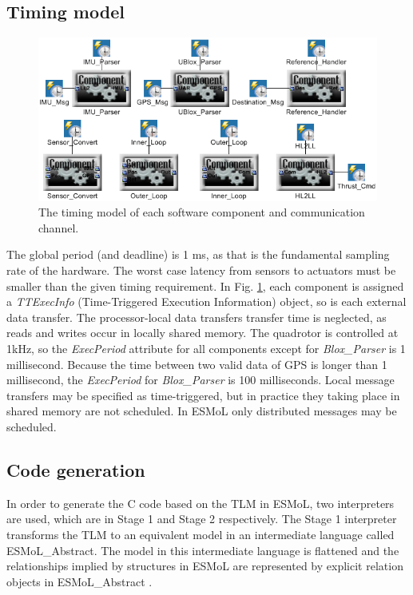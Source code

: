 \documentclass[10pt, conference, compsocconf]{IEEEtran}
\begin{document}
\subsection{Timing model}

\begin{figure}[!t]
\centering
\includegraphics[width=\columnwidth]{figures/QuadrotorTimingModel.png}
\caption{The timing model of each software component and communication channel.}
\label{fig:QuadrotorTimingModel}
\end{figure}

The global period (and deadline) is 1 ms, as that is the fundamental sampling rate of the hardware. The worst case latency from sensors to actuators must be smaller than the given timing requirement. In Fig. \ref{fig:QuadrotorTimingModel}, each component is assigned a \emph{TTExecInfo} (Time-Triggered Execution Information) object, so is each external data transfer. The processor-local data transfers transfer time is neglected, as reads and writes occur in locally shared memory. The quadrotor is controlled at 1kHz, so the \emph{ExecPeriod} attribute for all components except for \emph{Blox\_Parser} is 1 millisecond. Because the time between two valid data of GPS is longer than 1 millisecond, the \emph{ExecPeriod} for \emph{Blox\_Parser} is 100 milliseconds. Local message transfers may be specified as time-triggered, but in practice they taking place in shared memory are not scheduled. In ESMoL only distributed messages may be scheduled.

\subsection{Code generation}

In order to generate the C code based on the TLM in ESMoL, two interpreters are used, which are in Stage 1 and Stage 2 respectively. The Stage 1 interpreter transforms the TLM to an equivalent model in an intermediate language called ESMoL\_Abstract. The model in this intermediate language is flattened and the relationships implied by structures in ESMoL are represented by explicit relation objects in ESMoL\_Abstract \cite{modeling:esmol}.
\end{document}
